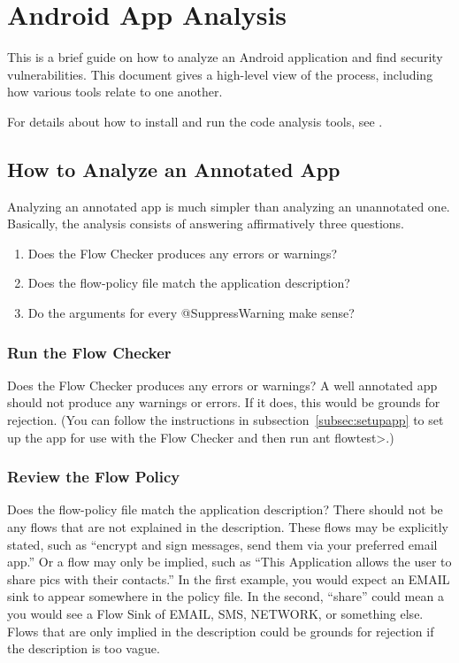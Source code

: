 \htmlhr
\chapter{Android App Analysis\label{appanalysis}}

This is a brief guide on how to analyze an Android application and
find security vulnerabilities. This document gives a high-level view
of the process, including how various tools relate to one another.

For details about how to install and run the code analysis tools, see .

\section{How to Analyze an Annotated App}
Analyzing an annotated app is much simpler than analyzing an unannotated one.  Basically, the analysis consists of answering affirmatively three questions.

\begin{enumerate}
\item Does the Flow Checker produces any errors or warnings?
\item Does the flow-policy file match the application description?
\item Do the arguments for every @SuppressWarning make sense?
\end{enumerate}

\subsection{Run the Flow Checker}
Does the Flow Checker produces any errors or warnings? A well annotated app should not produce
any warnings or errors.  If it does, this would be grounds for rejection.  (You can follow the instructions 
in subsection~\ref{subsec:setupapp} to set up the app for use with the Flow Checker and then run
\<ant flowtest>.)

\subsection{Review the Flow Policy}
Does the flow-policy file match the application description? There should not be any flows that are not 
explained in the description.  These flows may be explicitly stated, such as ``encrypt and sign messages, send them via your preferred email app.''   Or a flow may only be implied, such as ``This Application allows the user to share pics with their contacts.''  In the first example, you would expect an EMAIL sink to appear somewhere in the policy file. In the second, ``share'' could mean a you would see a Flow Sink of EMAIL, SMS, NETWORK, or something else.  Flows that are only implied in the description could be grounds for rejection if the description is too vague. 


